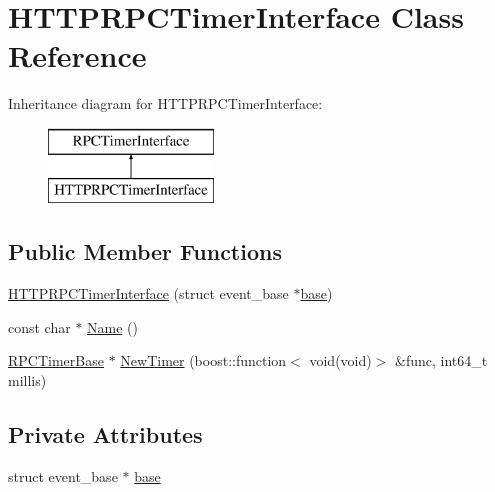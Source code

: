 \hypertarget{class_h_t_t_p_r_p_c_timer_interface}{}\section{H\+T\+T\+P\+R\+P\+C\+Timer\+Interface Class Reference}
\label{class_h_t_t_p_r_p_c_timer_interface}
Inheritance diagram for H\+T\+T\+P\+R\+P\+C\+Timer\+Interface\+:\begin{figure}[H]
\begin{center}
\leavevmode
\includegraphics[height=2.000000cm]{class_h_t_t_p_r_p_c_timer_interface}
\end{center}
\end{figure}
\subsection*{Public Member Functions}
\begin{DoxyCompactItemize}
\item 
\mbox{\hyperlink{class_h_t_t_p_r_p_c_timer_interface_acdf4f217699ec4d2b1c8c6d0ae92e963}{H\+T\+T\+P\+R\+P\+C\+Timer\+Interface}} (struct event\+\_\+base $\ast$\mbox{\hyperlink{class_h_t_t_p_r_p_c_timer_interface_aceb824988e2613856a47bc1246ece4e9}{base}})
\item 
const char $\ast$ \mbox{\hyperlink{class_h_t_t_p_r_p_c_timer_interface_a79d0040425233253bea84673c3cae97e}{Name}} ()
\item 
\mbox{\hyperlink{class_r_p_c_timer_base}{R\+P\+C\+Timer\+Base}} $\ast$ \mbox{\hyperlink{class_h_t_t_p_r_p_c_timer_interface_a20f33383f0462c4898cc7c9641dc7fa7}{New\+Timer}} (boost\+::function$<$ void(void)$>$ \&func, int64\+\_\+t millis)
\end{DoxyCompactItemize}
\subsection*{Private Attributes}
\begin{DoxyCompactItemize}
\item 
struct event\+\_\+base $\ast$ \mbox{\hyperlink{class_h_t_t_p_r_p_c_timer_interface_aceb824988e2613856a47bc1246ece4e9}{base}}
\end{DoxyCompactItemize}


